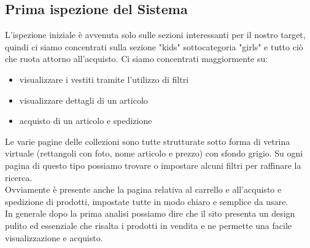 \documentclass[12pt,a4paper]{report}
\begin{document}
\subsection{Prima ispezione del Sistema}
L'ispezione iniziale è avvenuta solo sulle sezioni interessanti per il nostro target, quindi ci siamo concentrati sulla sezione "kids" sottocategoria "girls" e tutto ciò che ruota attorno all'acquisto.
Ci siamo concentrati maggiormente su:
\begin{itemize}
  \item visualizzare i vestiti tramite l'utilizzo di filtri
  \item visualizzare dettagli di un articolo
  \item acquisto di un articolo e spedizione
\end{itemize}
Le varie pagine delle collezioni sono tutte strutturate sotto forma di vetrina virtuale (rettangoli con foto, nome articolo e prezzo) con sfondo grigio. Su ogni pagina di questo tipo possiamo trovare o impostare alcuni filtri per raffinare la ricerca.\\
Ovviamente è presente anche la pagina relativa al carrello e all'acquisto e spedizione di prodotti, impostate tutte in modo chiaro e semplice da usare.\\
In generale dopo la prima analisi possiamo dire che il sito presenta un design pulito ed essenziale che risalta i prodotti in vendita e ne permette una facile visualizzazione e acquisto.
\end{document}
